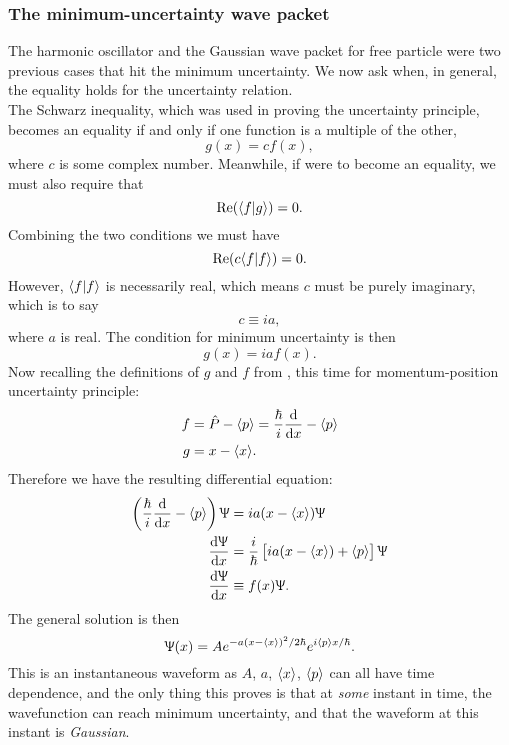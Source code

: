 \subsubsection{The minimum-uncertainty wave packet}
The harmonic oscillator and the Gaussian wave packet for free particle 
were two previous cases that hit the minimum uncertainty. We now ask 
when, in general, the equality holds for the uncertainty relation. \\
The Schwarz inequality, which was used in proving the uncertainty principle, 
becomes an equality if and only if one function is a multiple of the other, \ie 
\begin{equation}
g(x)=cf(x),
\end{equation}
where $c$ is some complex number. Meanwhile, if  were to become 
an equality, we must also require that 
\begin{equation}
\operatorname{Re}(\langle f|g\rangle)=0.
\end{equation}
Combining the two conditions we must have
\begin{equation}
\operatorname{Re}(c \langle f|f\rangle)=0.
\end{equation}
However, $\langle f|f\rangle$ is necessarily real, which means $c$ must be purely 
imaginary, which is to say 
\begin{equation}
c\equiv ia, 
\end{equation}
where $a$ is real. The condition for minimum uncertainty is then 
\begin{equation}
g(x)=iaf(x).
\end{equation}
Now recalling the definitions of $g$ and $f$ from , 
this time for momentum-position uncertainty principle: 
\begin{subequations}
\begin{align}
f&=\hat{P}- \lgl p\rgl=\frac{\hbar}{i}\diff{}{x}- \lgl p\rgl\\
g&=x- \lgl x\rgl.
\end{align}
\end{subequations}
Therefore we have the resulting differential equation: 
\begin{subequations}
\begin{align}
\lf(\frac{\hbar}{i}\diff{}{x}- \lgl p\rgl \rt)\ups&=ia(x- \lgl x\rgl)\ups\\
\diff{\ups}{x}&=\frac{i}{\hbar}\lf[ia(x- \lgl x\rgl)+\lgl p\rgl \rt]\ups\\
\diff{\ups}{x}&\equiv f(x)\ups.
\end{align}
\end{subequations}
The general solution is then 
\begin{equation}
\Uppsi(x)=Ae^{-a(x- \langle x\rangle)^2/2\hbar}e^{i \langle p\rangle x/\hbar}.
\end{equation}
This is an instantaneous waveform as $A$, $a$, $\langle x\rangle$, $\langle p\rangle$ can all 
have time dependence, and the only thing this proves is that at \textit{some} instant in time, the wavefunction can reach minimum uncertainty, 
and that the waveform at this instant is \textit{Gaussian}. 
